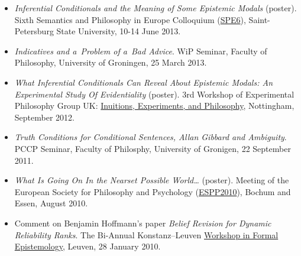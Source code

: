 \documentclass[a4paper,12pt]{article}
\begin{document}
\begin{small}
\begin{itemize}
  \item \emph{Inferential Conditionals and the Meaning of Some
      Epistemic Modals} (poster). Sixth Semantics and Philosophy
    in Europe Colloquium
    (\href{http://spe6conference.wordpress.com}{SPE6}),
    Saint-Petersburg State University, 10-14 June 2013.
    
  \item \emph{Indicatives and a~Problem of a~Bad Advice}. WiP
    Seminar, Faculty of Philosophy, University of Groningen, 25 March
    2013.
    
  \item \emph{What Inferential Conditionals Can Reveal About Epistemic
      Modals: An Experimental Study Of Evidentiality} (poster).
    3rd Workshop of Experimental Philosophy Group UK:
    \href{https://www.nottingham.ac.uk/philosophy/research/conferences/workshop-intuitions-experimentsandphilosophy.aspx}{Inuitions, Experiments, and Philosophy}, Nottingham, September 2012.

  \item \emph{Truth Conditions for Conditional Sentences, Allan
      Gibbard and Ambiguity}. PCCP Seminar, Faculty of
    Philosphy, University of Gronigen, 22 September 2011.
    
  \item \emph{What Is Going On In the Nearset Possible World\ldots} (poster). 
  Meeting of the European Society for Philosophy and  Psychology
    (\href{http://www.ruhr-uni-bochum.de/philosophy/espp2010/index.html}{ESPP2010}),
    Bochum and Essen, August 2010.

  \item Comment on Benjamin Hoffmann's paper \emph{Belief Revision for
      Dynamic Reliability Ranks}. The Bi-Annual Konstanz--Leuven
    \href{http://formalphilosophy.org/node/580}{Workshop in Formal
      Epistemology}, Leuven, 28 January 2010.
  \end{itemize}

  



  

\end{small}
\end{document}
